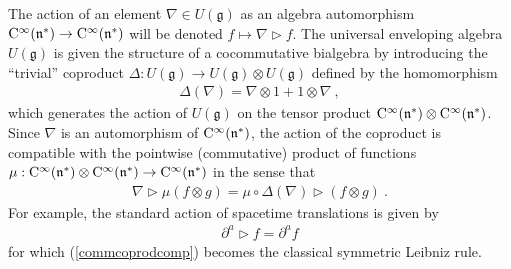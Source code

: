 \documentclass[11pt,a4paper]{article}
\def\CC{{\rm C}}
\def\mfn{{\mathfrak n}}
\def\mfg{{\mathfrak g}}
\newcommand{\beq}{\begin{eqnarray}}
\newcommand{\eeq}{\end{eqnarray}}
\begin{document}
The action of an element $\nabla\in U(\mfg)$ as an algebra
automorphism $\CC^\infty(\mfn^*)\to\CC^\infty(\mfn^*)$ will be denoted
$f\mapsto\nabla\triangleright f$. The universal enveloping algebra
$U(\mfg)$ is given the structure of a cocommutative bialgebra by
introducing the ``trivial'' coproduct $\Delta:U(\mfg)\to
U(\mfg)\otimes U(\mfg)$ defined by the homomorphism
\beq
\Delta(\nabla)=\nabla\otimes1+1\otimes\nabla \ ,
\label{trivialcoprod}\eeq
which generates the action of $U(\mfg)$ on the tensor product
$\CC^\infty(\mfn^*)\otimes\CC^\infty(\mfn^*)$. Since $\nabla$ is an
automorphism of $\CC^\infty(\mfn^*)$, the  action of the coproduct is
compatible with the pointwise (commutative) product of functions
$\mu:\CC^\infty(\mfn^*)\otimes\CC^\infty(\mfn^*)\to\CC^\infty(\mfn^*)$
in the sense that
\beq
\nabla\triangleright\mu(f\otimes g)=\mu\circ\Delta(\nabla)
\triangleright(f\otimes g) \ .
\label{commcoprodcomp}\eeq
For example, the standard action of spacetime translations is given by
\beq
\partial^a\triangleright f=\partial^af
\label{commtranslaction}\eeq
for which (\ref{commcoprodcomp}) becomes the classical symmetric
Leibniz rule.
\end{document}
